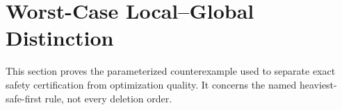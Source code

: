 \section{Worst-Case Local--Global Distinction}
\label{sec:or-local-global-gap}

This section proves the parameterized counterexample used to separate exact
safety certification from optimization quality. It concerns the named
heaviest-safe-first rule, not every deletion order.


